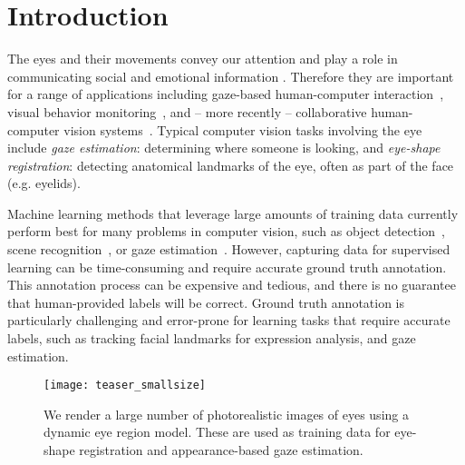 
\section{Introduction}

The eyes and their movements convey our attention and play a role in communicating social and emotional information \cite{Argyle1965}.
Therefore they are important for a range of applications including gaze-based human-computer interaction~\cite{majaranta14_apc}, visual behavior monitoring~\cite{bulling11_pami}, and -- more recently -- collaborative human-computer vision systems~\cite{papadopoulos2014training,sattar15_cvpr}. 
Typical computer vision tasks involving the eye include \emph{gaze estimation}: determining where someone is looking, and \emph{eye-shape registration}: detecting anatomical landmarks of the eye, often as part of the face (e.g. eyelids).

Machine learning methods that leverage large amounts of training data currently perform best for many problems in computer vision, such as object detection~\cite{girshick2014rich}, scene recognition~\cite{zhou2014learning}, or gaze estimation~\cite{zhang15_cvpr}.
However, capturing data for supervised learning can be time-consuming and require accurate ground truth annotation.
This annotation process can be expensive and tedious, and there is no guarantee that human-provided labels will be correct.
Ground truth annotation is particularly challenging and error-prone for learning tasks that require accurate labels, such as tracking facial landmarks for expression analysis, and gaze estimation.

\begin{figure}
    \texttt{[image: teaser\_smallsize]}
    \caption{We render a large number of photorealistic images of eyes using a dynamic eye region model. These are used as training data for eye-shape registration and appearance-based gaze estimation.}
    \label{fig:teaser}
\end{figure}

